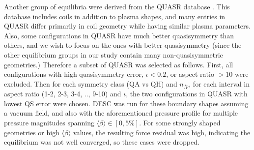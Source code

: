 \documentclass{jpp}
\begin{document}
Another group of equilibria were derived from the QUASR database \citep{giuliani2024direct, giuliani2024comprehensive}.
This database includes coils in addition to plasma shapes, and many entries in QUASR differ primarily in coil geometry while having similar plasma parameters.
Also, some configurations in QUASR have much better quasisymmetry than others, and we wish to focus on the ones with better quasisymmetry (since the other equilibrium groups in our study contain many non-quasisymmetric geometries.)
Therefore a subset of QUASR was selected as follows.
First, all configurations with high quasisymmetry error, $\iota< 0.2$, or aspect ratio $> 10$ were excluded.
Then for each symmetry class (QA vs QH) and $n_{fp}$, for each interval in aspect ratio (1-2, 2-3, 3-4, .., 9-10) and $\iota$, the two configurations in QUASR with lowest QS error were chosen.
DESC was run for these boundary shapes assuming a vacuum field, and also with the aforementioned pressure profile for multiple pressure magnitudes spanning $\langle\beta\rangle \in [0, 5\%]$.
For some strongly shaped geometries or high $\langle\beta\rangle$ values, the resulting force residual was high, indicating the equilibrium was not well converged, so these cases were dropped.
\end{document}
